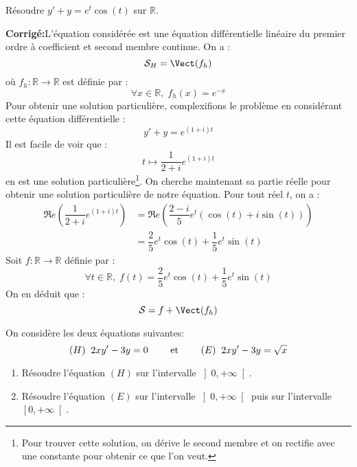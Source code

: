 \documentclass[a4paper,twoside,french,11pt]{VcCours}
\newcommand{\corr}{\textbf{Corrigé:}}
\begin{document}
\begin{Exercice}{} Résoudre $y'+y = e^t \cos(t)$ sur $\mathbb{R}$.
\end{Exercice}

\corr L'équation considérée est une équation différentielle linéaire du premier ordre à coefficient et second membre continue. On a :
$$ \mathcal{S}_H = \Vect(f_h)$$
où $f_h : \mathbb{R} \rightarrow \mathbb{R}$ est définie par :
$$ \forall x \in \mathbb{R}, \; f_h(x) = e^{-x}$$
Pour obtenir une solution particulière, \og complexifions \fg{} le problème en considérant cette équation différentielle :
$$ y'+y = e^{(1+i)t}$$
Il est facile de voir que :
$$ t \mapsto \dfrac{1}{2+i} e^{(1+i)t}$$
en est une solution particulière\footnote{Pour trouver cette solution, on dérive le second membre et on rectifie avec une constante pour obtenir ce que l'on veut.}. On cherche maintenant sa partie réelle pour obtenir une solution particulière de notre équation. Pour tout réel $t$, on a :
\begin{align*}
\Re e \left(\dfrac{1}{2+i} e^{(1+i)t} \right) & = \Re e \left(\dfrac{2-i}{5} e^t (\cos(t) + i \sin(t)) \right) \\
& = \dfrac{2}{5} e^t \cos(t) + \dfrac{1}{5} e^t \sin(t) 
\end{align*}
Soit $f : \mathbb{R} \rightarrow \mathbb{R}$ définie par :
$$ \forall t \in \mathbb{R}, \; f(t) = \dfrac{2}{5} e^t \cos(t) + \dfrac{1}{5} e^t \sin(t) $$
On en déduit que :
$$ \mathcal{S} = f +  \Vect(f_h)$$

\begin{Exercice}{} On considère les deux équations suivantes:
$$ (H) \; \;  2xy'-3y=0  \qquad \hbox{ et } \qquad (E) \; \; 2xy'-3y=\sqrt{x} $$
\begin{enumerate}
\item Résoudre l'équation $(H)$ sur l'intervalle $\left]  0,+\infty\right[ $.
\item Résoudre l'équation $(E)$ sur l'intervalle $\left]  0,+\infty\right[   $ puis sur l'intervalle $\left[ 0,+\infty\right[ $.
\end{enumerate}
\end{Exercice}
\end{document}
